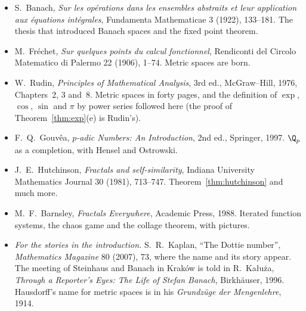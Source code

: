 \begin{itemize}
\item S.~Banach, \emph{Sur les op\'erations dans les ensembles abstraits et leur application aux \'equations int\'egrales}, Fundamenta
Mathematicae 3 (1922), 133--181. The thesis that introduced Banach spaces and the fixed point theorem.
\item M.~Fr\'echet, \emph{Sur quelques points du calcul fonctionnel}, Rendiconti del Circolo Matematico di Palermo 22 (1906), 1--74. Metric
spaces are born.
\item W.~Rudin, \emph{Principles of Mathematical Analysis}, 3rd ed., McGraw--Hill, 1976, Chapters~2, 3 and~8. Metric spaces in forty pages,
and the definition of $\exp$, $\cos$, $\sin$ and $\pi$ by power series followed here (the proof of Theorem~\ref{thm:exp}(e) is Rudin's).
\item F.~Q.~Gouv\^ea, \emph{$p$-adic Numbers: An Introduction}, 2nd ed., Springer, 1997. $\Q_p$ as a completion, with Hensel and Ostrowski.
\item J.~E.~Hutchinson, \emph{Fractals and self-similarity}, Indiana University Mathematics Journal 30 (1981), 713--747. Theorem~\ref{thm:hutchinson} and
much more.
\item M.~F.~Barnsley, \emph{Fractals Everywhere}, Academic Press, 1988. Iterated function systems, the chaos game and the collage
theorem, with pictures.
\item \emph{For the stories in the introduction.} S.~R.~Kaplan, ``The Dottie number'', \emph{Mathematics Magazine} 80 (2007), 73, where the name and its story appear. The
meeting of Steinhaus and Banach in Krak\'ow is told in R.~Ka\l u\.za, \emph{Through a Reporter's Eyes: The Life of Stefan Banach}, Birkh\"auser, 1996.
Hausdorff's name for metric spaces is in his \emph{Grundz\"uge der Mengenlehre}, 1914.
\end{itemize}
